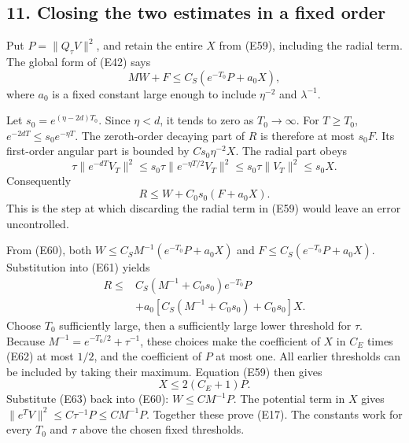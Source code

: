 \documentclass[
  11pt,
]{article}
\makeatletter
\let\ReaderOriginalAnchorStart\hyper@anchorstart
\let\ReaderOriginalAnchorEnd\hyper@anchorend
\let\ReaderPendingAliases\@empty
\def\ReaderArmAliases#1{\gdef\ReaderPendingAliases{#1}}
\def\hyper@anchorstart#1{\ReaderIfNativeAnchorTF{#1}{\ReaderPendingAliases\global\let\ReaderPendingAliases\@empty}{}\ReaderOriginalAnchorStart{#1}}
\makeatother
\begin{document}
\ReaderArmAliases{\ReaderOriginalAnchorStart{AN03-EXU-011}\ReaderOriginalAnchorEnd\begingroup\expandafter\def\csname @currentHref\endcsname{AN03-EXU-011}\label{AN03-EXU-011}\endgroup\ReaderOriginalAnchorStart{an03-exu-011-closing-the-two-estimates-in-a-fixed-order}\ReaderOriginalAnchorEnd\begingroup\expandafter\def\csname @currentHref\endcsname{an03-exu-011-closing-the-two-estimates-in-a-fixed-order}\label{an03-exu-011-closing-the-two-estimates-in-a-fixed-order}\endgroup\ReaderOriginalAnchorStart{11-closing-the-two-estimates-in-a-fixed-order}\ReaderOriginalAnchorEnd\begingroup\expandafter\def\csname @currentHref\endcsname{11-closing-the-two-estimates-in-a-fixed-order}\label{11-closing-the-two-estimates-in-a-fixed-order}\endgroup\ReaderOriginalAnchorStart{closing-the-two-estimates-in-a-fixed-order}\ReaderOriginalAnchorEnd}
\subsection{11. Closing the two estimates in a fixed
order}\label{closing-the-two-estimates-in-a-fixed-order}

Put \(P=\|Q_\tau V\|^2\), and retain the entire \(X\) from (E59),
including the radial term. The global form of (E42) says \[
                  MW+F\leq C_S(e^{-T_0}P+a_0X),                 \tag{E60}
\] where \(a_0\) is a fixed constant large enough to include
\(\eta^{-2}\) and \(\lambda^{-1}\).

Let \(s_0=e^{(\eta-2d)T_0}\). Since \(\eta<d\), it tends to zero as
\(T_0\to\infty\). For \(T\geq T_0\), \(e^{-2dT}\leq s_0e^{-\eta T}\).
The zeroth-order decaying part of \(R\) is therefore at most \(s_0F\).
Its first-order angular part is bounded by \(C s_0\eta^{-2}X\). The
radial part obeys \[
 \tau\|e^{-dT}V_T\|^2
      \leq s_0\tau\|e^{-\eta T/2}V_T\|^2
      \leq s_0\tau\|V_T\|^2\leq s_0X.
\] Consequently \[
                         R\leq W+C_0s_0(F+a_0X).                \tag{E61}
\] This is the step at which discarding the radial term in (E59) would
leave an error uncontrolled.

From (E60), both \(W\leq C_SM^{-1}(e^{-T_0}P+a_0X)\) and
\(F\leq C_S(e^{-T_0}P+a_0X)\). Substitution into (E61) yields \[
\begin{split}
 R\leq&
 C_S(M^{-1}+C_0s_0)e^{-T_0}P\\
 &+a_0\left[C_S(M^{-1}+C_0s_0)+C_0s_0\right]X.
\end{split}                                                       \tag{E62}
\] Choose \(T_0\) sufficiently large, then a sufficiently large lower
threshold for \(\tau\). Because \(M^{-1}=e^{-T_0/2}+\tau^{-1}\), these
choices make the coefficient of \(X\) in \(C_E\) times (E62) at most
\(1/2\), and the coefficient of \(P\) at most one. All earlier
thresholds can be included by taking their maximum. Equation (E59) then
gives \[
                           X\leq2(C_E+1)P.                      \tag{E63}
\] Substitute (E63) back into (E60): \(W\leq CM^{-1}P\). The potential
term in \(X\) gives \(\|e^TV\|^2\leq C\tau^{-1}P\leq CM^{-1}P\).
Together these prove (E17). The constants work for every \(T_0\) and
\(\tau\) above the chosen fixed thresholds.
\end{document}
